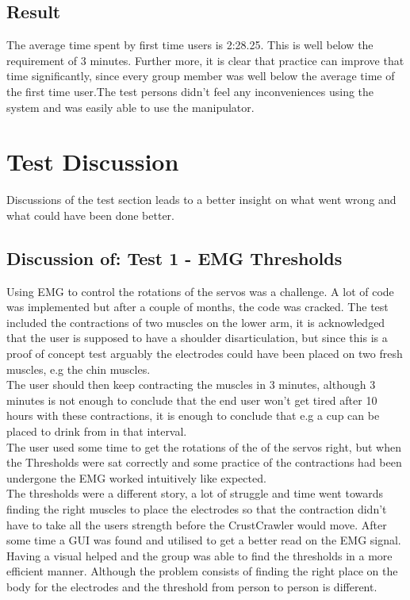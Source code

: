 \subsection*{Result}
The average time spent by first time users is 2:28.25. This is well below the requirement of 3 minutes. Further more, it is clear that practice can improve that time significantly, since every group member was well below the average time of the first time user.The test persons didn't feel any inconveniences using the system and was easily able to use the manipulator. 



\section{Test Discussion} \label{sec:discuss}

Discussions of the test section leads to a better insight on what went wrong and what could have been done better.

\subsection*{Discussion of: Test 1 - EMG Thresholds}
Using EMG to control the rotations of the servos was a challenge. A lot of code was implemented but after a couple of months, the code was cracked. The test included the contractions of two muscles on the lower arm, it is acknowledged that the user is supposed to have a shoulder disarticulation, but since this is a proof of concept test arguably the electrodes could have been placed on two fresh muscles, e.g the chin muscles.\\
The user should then keep contracting the muscles in 3 minutes, although 3 minutes is not enough to conclude that the end user won't get tired after 10 hours with these contractions, it is enough to conclude that e.g a cup can be placed to drink from in that interval.\\
The user used some time to get the rotations of the of the servos right, but when the Thresholds were sat correctly and some practice of the contractions had been undergone the EMG worked intuitively like expected.\\
The thresholds were a different story, a lot of struggle and time went towards finding the right muscles to place the electrodes so that the contraction didn't have to take all the users strength before the CrustCrawler would move. After some time a GUI was found and utilised to get a better read on the EMG signal. Having a visual helped and the group was able to find the thresholds in a more efficient manner. Although the problem consists of finding the right place on the body for the electrodes and the threshold from person to person is different.

